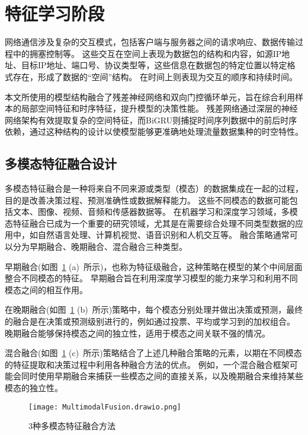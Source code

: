 \section{特征学习阶段}
网络通信涉及复杂的交互模式，包括客户端与服务器之间的请求响应、数据传输过程中的拥塞控制等。
这些交互在空间上表现为数据包的结构和内容，如源IP地址、目标IP地址、端口号、协议类型等，这些信息在数据包的特定位置以特定格式存在，形成了数据的“空间”结构。
在时间上则表现为交互的顺序和持续时间。\par

本文所使用的模型结构融合了残差神经网络和双向门控循环单元，旨在综合利用样本的局部空间特征和时序特征，提升模型的决策性能。
残差网络通过深层的神经网络架构有效提取复杂的空间特征，而BiGRU则捕捉时间序列数据中的前后时序依赖，通过这种结构的设计以使模型能够更准确地处理流量数据集种的时空特性。
\subsection{多模态特征融合设计}
多模态特征融合是一种将来自不同来源或类型（模态）的数据集成在一起的过程，目的是改善决策过程、预测准确性或数据解释能力。
这些不同模态的数据可能包括文本、图像、视频、音频和传感器数据等。
在机器学习和深度学习领域，多模态特征融合已成为一个重要的研究领域，尤其是在需要综合处理不同类型数据的应用中，如自然语言处理、计算机视觉、语音识别和人机交互等。
融合策略通常可以分为早期融合、晚期融合、混合融合三种类型。\par

早期融合(如图~\ref{fig:MultimodalFusio} (a)~所示)，也称为特征级融合，这种策略在模型的某个中间层面整合不同模态的特征。
早期融合旨在利用深度学习模型的能力来学习和利用不同模态之间的相互作用。\par

在晚期融合(如图~\ref{fig:MultimodalFusio} (b)~所示)策略中，每个模态分别处理并做出决策或预测，最终的融合是在决策或预测级别进行的，例如通过投票、平均或学习到的加权组合。
晚期融合能够保持模态之间的独立性，适用于模态之间关联不强的情况。\par

混合融合(如图~\ref{fig:MultimodalFusio} (c)~所示)策略结合了上述几种融合策略的元素，以期在不同模态的特征提取和决策过程中利用各种融合方法的优点。
例如，一个混合融合框架可能会同时使用早期融合来捕获一些模态之间的直接关系，以及晚期融合来维持某些模态的独立性。

\begin{figure}[htbp]
  \centering
  \texttt{[image: MultimodalFusion.drawio.png]}
  \caption{3种多模态特征融合方法\cite{hejunandzhangcaiqing}}
  \label{fig:MultimodalFusio}
\end{figure}

